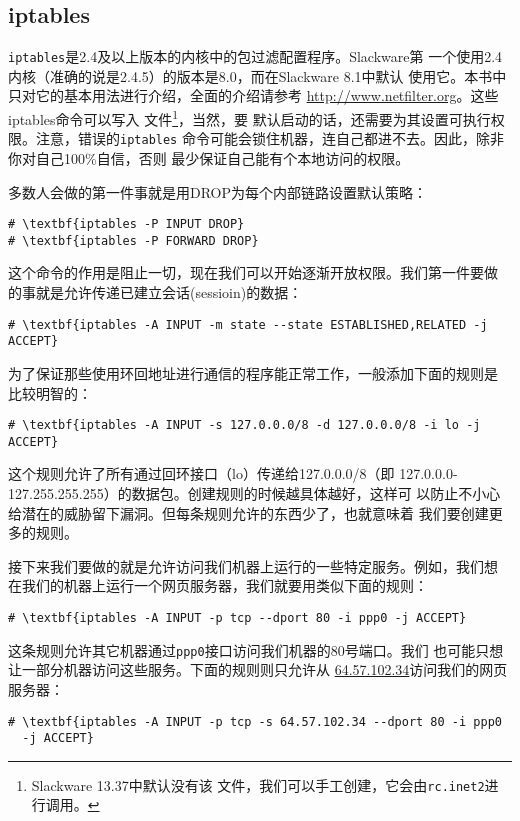 \subsection{iptables}
\label{sec:security:hostAccessControl:iptables}
\texttt{iptables}是2.4及以上版本的内核中的包过滤配置程序。Slackware第
一个使用2.4内核（准确的说是2.4.5）的版本是8.0，而在Slackware 8.1中默认
使用它。本书中只对它的基本用法进行介绍，全面的介绍请参考
\url{http://www.netfilter.org}。这些iptables命令可以写入
文件\footnote{Slackware 13.37中默认没有该
  文件，我们可以手工创建，它会由\texttt{rc.inet2}进行调用。}，当然，要
默认启动的话，还需要为其设置可执行权限。注意，错误的\texttt{iptables}
命令可能会锁住机器，连自己都进不去。因此，除非你对自己100\%自信，否则
最少保证自己能有个本地访问的权限。

多数人会做的第一件事就是用DROP为每个内部链路设置默认策略：
\begin{Verbatim}[frame=single, commandchars=\\\{\}]
# \textbf{iptables -P INPUT DROP}
# \textbf{iptables -P FORWARD DROP}
\end{Verbatim}
这个命令的作用是阻止一切，现在我们可以开始逐渐开放权限。我们第一件要做
的事就是允许传递已建立会话(sessioin)的数据：
\begin{Verbatim}[frame=single, commandchars=\\\{\}]
# \textbf{iptables -A INPUT -m state --state ESTABLISHED,RELATED -j ACCEPT}
\end{Verbatim}

为了保证那些使用环回地址进行通信的程序能正常工作，一般添加下面的规则是
比较明智的：
\begin{Verbatim}[frame=single, commandchars=\\\{\}]
# \textbf{iptables -A INPUT -s 127.0.0.0/8 -d 127.0.0.0/8 -i lo -j ACCEPT}
\end{Verbatim}

这个规则允许了所有通过回环接口（lo）传递给127.0.0.0/8（即
127.0.0.0-127.255.255.255）的数据包。创建规则的时候越具体越好，这样可
以防止不小心给潜在的威胁留下漏洞。但每条规则允许的东西少了，也就意味着
我们要创建更多的规则。

接下来我们要做的就是允许访问我们机器上运行的一些特定服务。例如，我们想
在我们的机器上运行一个网页服务器，我们就要用类似下面的规则：
\begin{Verbatim}[frame=single, commandchars=\\\{\}]
# \textbf{iptables -A INPUT -p tcp --dport 80 -i ppp0 -j ACCEPT}
\end{Verbatim}
这条规则允许其它机器通过\texttt{ppp0}接口访问我们机器的80号端口。我们
也可能只想让一部分机器访问这些服务。下面的规则则只允许从
\url{64.57.102.34}访问我们的网页服务器：
\begin{Verbatim}[frame=single, commandchars=\\\{\}]
# \textbf{iptables -A INPUT -p tcp -s 64.57.102.34 --dport 80 -i ppp0
  -j ACCEPT}
\end{Verbatim}

